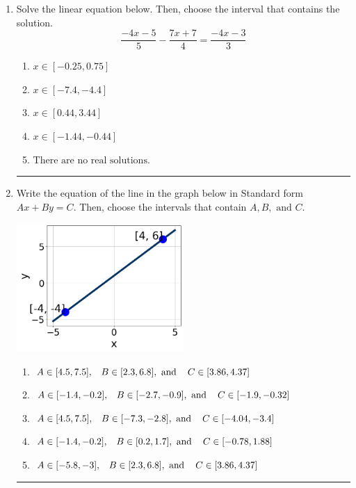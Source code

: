 \documentclass[14pt]{extbook}
\newcommand{\litem}[1]{\item#1\hspace*{-1cm}\rule{\textwidth}{0.4pt}}
\begin{document}
\begin{enumerate}
{\begin{enumerate}[label=\Alph*.]
\end{enumerate} }
\litem{
Solve the linear equation below. Then, choose the interval that contains the solution.\[ \frac{-4x -5}{5} - \frac{7x + 7}{4} = \frac{-4x -3}{3} \]\begin{enumerate}[label=\Alph*.]
\item \( x \in [-0.25, 0.75] \)
\item \( x \in [-7.4, -4.4] \)
\item \( x \in [0.44, 3.44] \)
\item \( x \in [-1.44, -0.44] \)
\item \( \text{There are no real solutions.} \)

\end{enumerate} }
\litem{
Write the equation of the line in the graph below in Standard form $Ax+By=C$. Then, choose the intervals that contain $A, B, \text{ and } C$.
\begin{center}
    \includegraphics[width=0.5\textwidth]{../Figures/linearGraphToStandardCopyC.png}
\end{center}
\begin{enumerate}[label=\Alph*.]
\item \( A \in [4.5, 7.5], \hspace{3mm} B \in [2.3, 6.8], \text{ and } \hspace{3mm} C \in [3.86, 4.37] \)
\item \( A \in [-1.4, -0.2], \hspace{3mm} B \in [-2.7, -0.9], \text{ and } \hspace{3mm} C \in [-1.9, -0.32] \)
\item \( A \in [4.5, 7.5], \hspace{3mm} B \in [-7.3, -2.8], \text{ and } \hspace{3mm} C \in [-4.04, -3.4] \)
\item \( A \in [-1.4, -0.2], \hspace{3mm} B \in [0.2, 1.7], \text{ and } \hspace{3mm} C \in [-0.78, 1.88] \)
\item \( A \in [-5.8, -3], \hspace{3mm} B \in [2.3, 6.8], \text{ and } \hspace{3mm} C \in [3.86, 4.37] \)


\end{enumerate}}
\end{enumerate}
\end{document}
